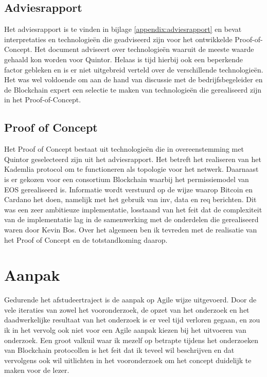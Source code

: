 \newpage
\subsection{Adviesrapport}

Het adviesrapport is te vinden in bijlage \ref{appendix:adviesrapport} en bevat interpretaties en technologieën die geadviseerd zijn voor het ontwikkelde Proof-of-Concept. Het document adviseert over technologieën waaruit de meeste waarde gehaald kon worden voor Quintor. Helaas is tijd hierbij ook een beperkende factor gebleken en is er niet uitgebreid verteld over de verschillende technologieën. Het was wel voldoende om aan de hand van discussie met de bedrijfsbegeleider en de Blockchain expert een selectie te maken van technologieën die gerealiseerd zijn in het Proof-of-Concept.

\subsection{Proof of Concept}

Het Proof of Concept bestaat uit technologieën die in overeenstemming met Quintor geselecteerd zijn uit het adviesrapport. Het betreft het realiseren van het Kademlia protocol om te functioneren als topologie voor het netwerk. Daarnaast is er gekozen voor een consortium Blockchain waarbij het permissiemodel van EOS gerealiseerd is. Informatie wordt verstuurd op de wijze waarop Bitcoin en Cardano het doen, namelijk met het gebruik van inv, data en req berichten. Dit was een zeer ambitieuze implementatie, losstaand van het feit dat de complexiteit van de implementatie lag in de samenwerking met de onderdelen die gerealiseerd waren door Kevin Bos. Over het algemeen ben ik tevreden met de realisatie van het Proof of Concept en de totstandkoming daarop.

\section{Aanpak}

Gedurende het afstudeertraject is de aanpak op Agile wijze uitgevoerd. Door de vele iteraties van zowel het vooronderzoek, de opzet van het onderzoek en het daadwerkelijke resultaat van het onderzoek is er veel tijd verloren gegaan, en zou ik in het vervolg ook niet voor een Agile aanpak kiezen bij het uitvoeren van onderzoek. Een groot valkuil waar ik mezelf op betrapte tijdens het onderzoeken van Blockchain protocollen is het feit dat ik teveel wil beschrijven en dat vervolgens ook wil uitlichten in het vooronderzoek om het concept duidelijk te maken voor de lezer.

